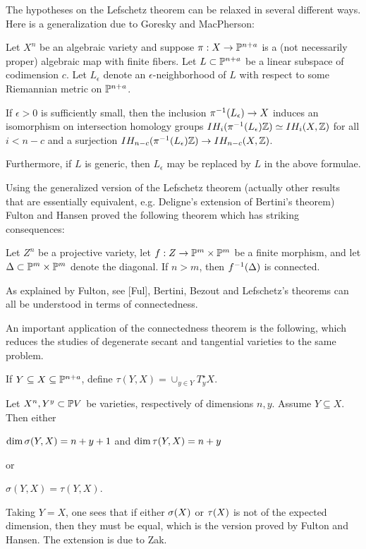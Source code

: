 The hypotheses on the Lefschetz theorem can be relaxed   in several
different
ways. Here is a generalization due to Goresky and MacPherson:

 Let $X^n$ be an algebraic variety and 
suppose $\pi: X\rightarrow\Bbb P^{n+a}$ is a (not necessarily proper)
algebraic map with finite fibers. Let $L\subset\Bbb P^{n+a}$ be a linear subspace
of codimension $c$.
Let $L_{\epsilon}$ denote an $\epsilon$-neighborhood of $L$ with respect to
some Riemannian metric on $\Bbb P^{n+a}$.

If $\epsilon>0$ is sufficiently small, then the inclusion
$\pi{}^{-1} (L_{\epsilon})\rightarrow X$ induces an isomorphism
on intersection homology groups
$IH_i(\pi{}^{-1} (L_{\epsilon})\Bbb Z)\simeq IH_i(X,\Bbb Z)$ for all
$i<n-c$ and a surjection 
$IH_{n-c}(\pi{}^{-1} (L_{\epsilon})\Bbb Z)\rightarrow IH_{n-c}(X,\Bbb Z)$.

Furthermore, if $L$ is generic, then $L_{\epsilon}$ may be replaced
by $L$ in the above formulae.
\endproclaim 



Using the generalized version
of the Lefschetz theorem (actually   other results
that are essentially equivalent, e.g.
Deligne's extension of Bertini's theorem) Fulton and Hansen
proved the following theorem which has striking consequences:

 Let $Z^n$ be a projective
variety, let $f: Z\rightarrow\Bbb P^{m}\times\Bbb P^{m}$ be a finite morphism, and
let $\Delta\subset\Bbb P^{m}\times\Bbb P^{m}$ denote the diagonal. If
$n>m$, then $f{}^{-1} (\Delta )$ is connected.
\endproclaim

As explained
by Fulton, see [Ful],
 Bertini, Bezout and Lefschetz's theorems
can all be understood in terms of  
connectedness.  


An important application of the connectedness theorem is the following,
which reduces the studies of degenerate secant and tangential
varieties to the same problem. 
 
If $Y\subseteq X\subseteq\Bbb P^{n+a}$, define $\tau (Y,X)=\cup_{y\in
Y}T^{\star}_yX$.

 Let
$X^n,Y^y\subset\Bbb P  V$ be varieties, respectively  of dimensions
$n,y$. Assume $Y\subseteq X$.
Then either

$\text{dim}\, \sigma (Y,X)= n+y+1$ and $\text{dim}\,\tau (Y,X)= n+y$

or

$\sigma(Y,X)=\tau (Y,X)$.\endproclaim

Taking $Y=X$, one sees that if either $\sigma (X)$ or $\tau(X)$ is
not of the expected dimension, then they must be equal, which 
is the version proved by Fulton and Hansen. The extension is
due to Zak.

